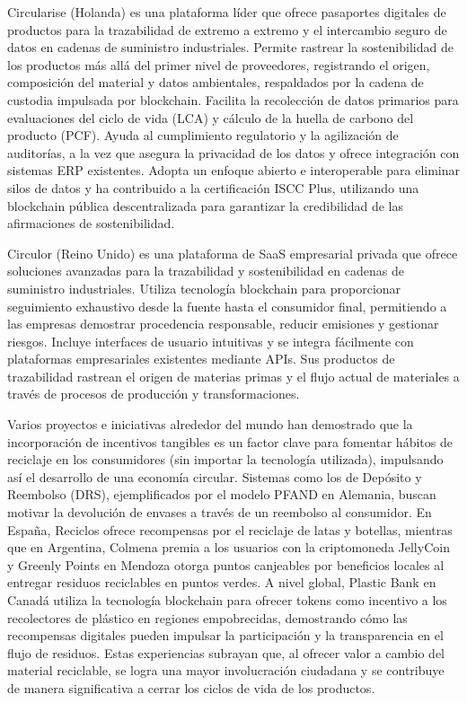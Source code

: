 Circularise (Holanda) es una plataforma líder que ofrece pasaportes digitales de productos para la trazabilidad de extremo a extremo y el intercambio seguro de datos en cadenas de suministro industriales. Permite rastrear la sostenibilidad de los productos más allá del primer nivel de proveedores, registrando el origen, composición del material y datos ambientales, respaldados por la cadena de custodia impulsada por blockchain. Facilita la recolección de datos primarios para evaluaciones del ciclo de vida (LCA) y cálculo de la huella de carbono del producto (PCF). Ayuda al cumplimiento regulatorio y la agilización de auditorías, a la vez que asegura la privacidad de los datos y ofrece integración con sistemas ERP existentes. Adopta un enfoque abierto e interoperable para eliminar silos de datos y ha contribuido a la certificación ISCC Plus, utilizando una blockchain pública descentralizada para garantizar la credibilidad de las afirmaciones de sostenibilidad.

Circulor (Reino Unido) es una plataforma de SaaS empresarial privada que ofrece soluciones avanzadas para la trazabilidad y sostenibilidad en cadenas de suministro industriales. Utiliza tecnología blockchain para proporcionar seguimiento exhaustivo desde la fuente hasta el consumidor final, permitiendo a las empresas demostrar procedencia responsable, reducir emisiones y gestionar riesgos. Incluye interfaces de usuario intuitivas y se integra fácilmente con plataformas empresariales existentes mediante APIs. Sus productos de trazabilidad rastrean el origen de materias primas y el flujo actual de materiales a través de procesos de producción y transformaciones.

Varios proyectos e iniciativas alrededor del mundo han demostrado que la incorporación de incentivos tangibles es un factor clave para fomentar hábitos de reciclaje en los consumidores (sin importar la tecnología utilizada), impulsando así el desarrollo de una economía circular. Sistemas como los de Depósito y Reembolso (DRS), ejemplificados por el modelo PFAND en Alemania, buscan motivar la devolución de envases a través de un reembolso al consumidor. En España, 
Reciclos ofrece recompensas por el reciclaje de latas y botellas, mientras que en Argentina, Colmena premia a los usuarios con la criptomoneda JellyCoin y Greenly Points en Mendoza otorga puntos canjeables por beneficios locales al entregar residuos reciclables en puntos verdes. A nivel global, Plastic Bank en Canadá utiliza la tecnología blockchain para ofrecer tokens como incentivo a los recolectores de plástico en regiones empobrecidas, demostrando cómo las recompensas digitales pueden impulsar la participación y la transparencia en el flujo de residuos. Estas experiencias subrayan que, al ofrecer valor a cambio del material reciclable, se logra una mayor involucración ciudadana y se contribuye de manera significativa a cerrar los ciclos de vida de los productos.

